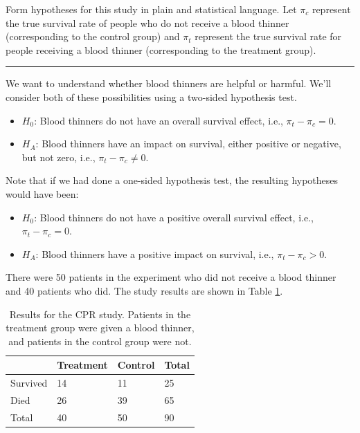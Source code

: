 \documentclass[
  10pt,
  openany]{book}
\theoremstyle{definition}
\theoremstyle{definition}
\theoremstyle{definition}
\theoremstyle{definition}
\theoremstyle{remark}
\begin{document}
Form hypotheses for this study in plain and statistical language. Let \(\pi_c\) represent the true survival rate of people who do not receive a blood thinner (corresponding to the control group) and \(\pi_t\) represent the true survival rate for people receiving a blood thinner (corresponding to the treatment group).

\begin{center}\rule{0.5\linewidth}{0.5pt}\end{center}

We want to understand whether blood thinners are helpful or harmful. We'll consider both of these possibilities using a two-sided hypothesis test.

\begin{itemize}
\item
  \(H_0\): Blood thinners do not have an overall survival effect, i.e., \(\pi_t - \pi_c = 0\).
\item
  \(H_A\): Blood thinners have an impact on survival, either positive or negative, but not zero, i.e., \(\pi_t - \pi_c \neq 0\).
\end{itemize}

Note that if we had done a one-sided hypothesis test, the resulting hypotheses would have been:

\begin{itemize}
\item
  \(H_0\): Blood thinners do not have a positive overall survival effect, i.e., \(\pi_t - \pi_c = 0\).
\item
  \(H_A\): Blood thinners have a positive impact on survival, i.e., \(\pi_t - \pi_c > 0\).
\end{itemize}

There were 50 patients in the experiment who did not receive a blood thinner and 40 patients who did. The study results are shown in Table \ref{tab:resultsForCPRStudyInSmallSampleSection}.

\begin{table}
\centering
\caption{\label{tab:resultsForCPRStudyInSmallSampleSection}Results for the CPR study. Patients in the treatment group were given a blood thinner, and patients in the control group were not.}
\centering
\begin{tabular}[t]{l|l|l|l}
\hline
 & Treatment & Control & Total\\
\hline
Survived & 14 & 11 & 25\\
\hline
Died & 26 & 39 & 65\\
\hline
Total & 40 & 50 & 90\\
\hline
\end{tabular}
\end{table}
\end{document}
